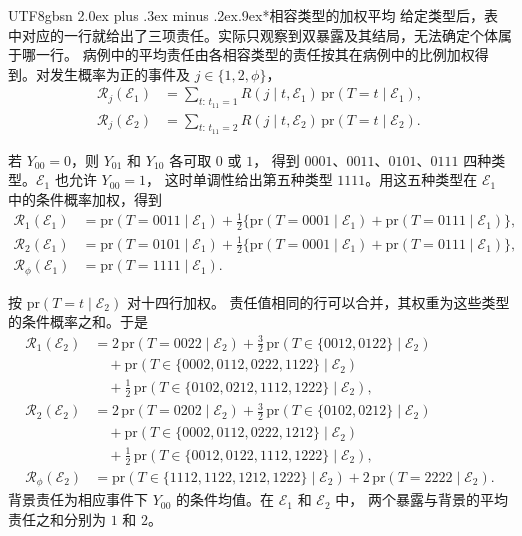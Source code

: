 \documentclass[11pt,a4paper]{article}
\makeatletter
\newcommand{\headingweight}{\ifPDFTeX\mdseries\else\bfseries\fi}
\renewcommand{\section}{\@startsection{section}{1}{0pt}
  {2.0ex plus .3ex minus .2ex}{.9ex}{\normalfont\large\headingweight}}
\makeatother
\begin{document}
\begin{CJK*}{UTF8}{gbsn}
\clearpage
\section*{相容类型的加权平均}
给定类型后，表中对应的一行就给出了三项责任。实际只观察到双暴露及其结局，无法确定个体属于哪一行。
病例中的平均责任由各相容类型的责任按其在病例中的比例加权得到。对发生概率为正的事件及 $j\in\{1,2,\phi\}$，
\[
\begin{aligned}
 \mathcal R_j(\mathcal E_1)&=\sum_{t:\,t_{11}=1}R(j\mid t,\mathcal E_1)\,\mathrm{pr}(T=t\mid\mathcal E_1),\\
 \mathcal R_j(\mathcal E_2)&=\sum_{t:\,t_{11}=2}R(j\mid t,\mathcal E_2)\,\mathrm{pr}(T=t\mid\mathcal E_2).
\end{aligned}
\]

\noindent{\headingweight $\mathcal E_1$。} 若 $Y_{00}=0$，则 $Y_{01}$ 和 $Y_{10}$ 各可取 $0$ 或 $1$，
得到 $0001$、$0011$、$0101$、$0111$ 四种类型。$\mathcal E_1$ 也允许 $Y_{00}=1$，
这时单调性给出第五种类型 $1111$。用这五种类型在 $\mathcal E_1$ 中的条件概率加权，得到
\[
\begin{aligned}
 \mathcal R_1(\mathcal E_1)
 &=\mathrm{pr}(T=0011\mid\mathcal E_1)
 +\tfrac12\{\mathrm{pr}(T=0001\mid\mathcal E_1)+\mathrm{pr}(T=0111\mid\mathcal E_1)\},\\
 \mathcal R_2(\mathcal E_1)
 &=\mathrm{pr}(T=0101\mid\mathcal E_1)
 +\tfrac12\{\mathrm{pr}(T=0001\mid\mathcal E_1)+\mathrm{pr}(T=0111\mid\mathcal E_1)\},\\
 \mathcal R_\phi(\mathcal E_1)&=\mathrm{pr}(T=1111\mid\mathcal E_1).
\end{aligned}
\]

\noindent{\headingweight $\mathcal E_2$。} 按 $\mathrm{pr}(T=t\mid\mathcal E_2)$ 对十四行加权。
责任值相同的行可以合并，其权重为这些类型的条件概率之和。于是
\[
\begin{aligned}
 \mathcal R_1(\mathcal E_2)
 &=2\,\mathrm{pr}(T=0022\mid\mathcal E_2)
    +\tfrac32\,\mathrm{pr}(T\in\{0012,0122\}\mid\mathcal E_2)\\
 &\quad+\mathrm{pr}(T\in\{0002,0112,0222,1122\}\mid\mathcal E_2)\\
 &\quad+\tfrac12\,\mathrm{pr}(T\in\{0102,0212,1112,1222\}\mid\mathcal E_2),\\[3pt]
 \mathcal R_2(\mathcal E_2)
 &=2\,\mathrm{pr}(T=0202\mid\mathcal E_2)
    +\tfrac32\,\mathrm{pr}(T\in\{0102,0212\}\mid\mathcal E_2)\\
 &\quad+\mathrm{pr}(T\in\{0002,0112,0222,1212\}\mid\mathcal E_2)\\
 &\quad+\tfrac12\,\mathrm{pr}(T\in\{0012,0122,1112,1222\}\mid\mathcal E_2),\\[3pt]
 \mathcal R_\phi(\mathcal E_2)
 &=\mathrm{pr}(T\in\{1112,1122,1212,1222\}\mid\mathcal E_2)
      +2\,\mathrm{pr}(T=2222\mid\mathcal E_2).
\end{aligned}
\]
背景责任为相应事件下 $Y_{00}$ 的条件均值。在 $\mathcal E_1$ 和 $\mathcal E_2$ 中，
两个暴露与背景的平均责任之和分别为 $1$ 和 $2$。


\end{CJK*}
\end{document}
